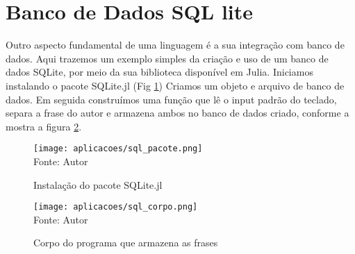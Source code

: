 


\section{Banco de Dados SQL lite}

Outro aspecto fundamental de uma linguagem é a sua integração com banco de dados. Aqui trazemos um exemplo simples da criação e uso de um banco de dados SQLite, por meio da sua biblioteca disponível em Julia. 
Iniciamos instalando o pacote SQLite.jl (Fig \ref{sql_pacote})
Criamos um objeto e arquivo de banco de dados. Em seguida construímos uma função que lê o input padrão do teclado, separa a frase do autor e armazena ambos no banco de dados criado, conforme a mostra a figura \ref{sql_corpo}.

\begin{figure}[H]
   \begin{center}
       \caption{Instalação do pacote SQLite.jl} \label{sql_pacote}
       \texttt{[image: aplicacoes/sql\_pacote.png]} \\
       {\tiny \sf Fonte: Autor}
   \end{center}
\end{figure}

\begin{figure}[H]
   \begin{center}
       \caption{Corpo do programa que armazena as frases} \label{sql_corpo}
       \texttt{[image: aplicacoes/sql\_corpo.png]} \\
       {\tiny \sf Fonte: Autor}
   \end{center}
\end{figure}

